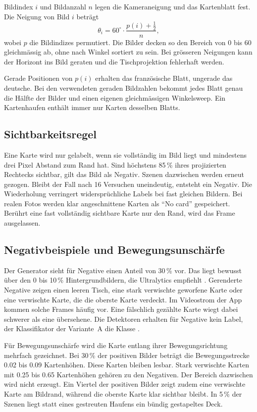 Bildindex $i$ und Bildanzahl $n$ legen die Kameraneigung und das
Kartenblatt fest. Die Neigung von Bild $i$ beträgt
\[
  \theta_i = 60^\circ \cdot \frac{p(i) + \tfrac{1}{2}}{n},
\]
wobei $p$ die Bildindizes permutiert. Die Bilder decken so den Bereich
von 0\textdegree{} bis 60\textdegree{} gleichmässig ab, ohne nach Winkel
sortiert zu sein. Bei grösseren Neigungen kann der Horizont ins Bild
geraten und die Tischprojektion fehlerhaft werden.

Gerade Positionen von $p(i)$ erhalten das französische Blatt, ungerade
das deutsche. Bei den verwendeten geraden Bildzahlen bekommt jedes Blatt
genau die Hälfte der Bilder und einen eigenen gleichmässigen Winkelsweep.
Ein Kartenhaufen enthält immer nur Karten desselben Blatts.

\subsection{Sichtbarkeitsregel}\label{sec:sichtbarkeit}

Eine Karte wird nur gelabelt, wenn sie vollständig im Bild liegt und
mindestens drei Pixel Abstand zum Rand hat. Sind höchstens 85\,\% ihres
projizierten Rechtecks sichtbar, gilt das Bild als Negativ. Szenen
dazwischen werden erneut gezogen. Bleibt der Fall nach 16 Versuchen
uneindeutig, entsteht ein Negativ. Die Wiederholung verringert
widersprüchliche Labels bei fast gleichen Bildern. Bei realen Fotos
werden klar
angeschnittene Karten als \enquote{No card} gespeichert. Berührt eine
fast vollständig sichtbare Karte nur den Rand, wird das Frame
ausgelassen.

\subsection{Negativbeispiele und Bewegungsunschärfe}\label{sec:negative}

Der Generator sieht für Negative einen Anteil von 30\,\% vor. Das liegt
bewusst über den 0 bis 10\,\% Hintergrundbildern, die Ultralytics
empfiehlt \cite{ultralytics2025tips}. Gerenderte
Negative zeigen einen leeren Tisch, eine stark verwischte geworfene Karte
oder eine verwischte Karte, die die oberste Karte verdeckt. Im Videostrom
der App kommen solche Frames häufig vor. Eine fälschlich gezählte Karte
wiegt dabei schwerer als eine übersehene. Die Detektoren erhalten für
Negative kein Label, der Klassifikator der Variante~A die Klasse
.

Für Bewegungsunschärfe wird die Karte entlang ihrer Bewegungsrichtung
mehrfach gezeichnet. Bei 30\,\% der positiven Bilder beträgt die
Bewegungsstrecke 0.02 bis 0.09 Kartenhöhen. Diese Karten bleiben lesbar.
Stark verwischte Karten mit 0.25 bis 0.65 Kartenhöhen gehören zu den
Negativen. Der Bereich dazwischen wird nicht erzeugt. Ein Viertel der
positiven Bilder zeigt zudem eine verwischte Karte am Bildrand, während
die oberste Karte klar sichtbar bleibt. In 5\,\% der Szenen liegt statt eines
gestreuten Haufens ein bündig gestapeltes Deck.

